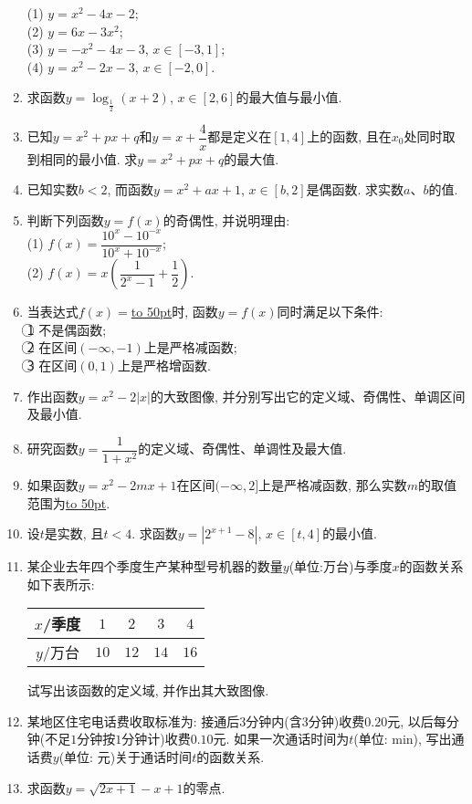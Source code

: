 \documentclass[10pt,a4paper]{article}
\newcommand{\blank}[1]{\underline{\hbox to #1pt{}}}
\begin{document}
\begin{enumerate}[1.]
(1) $y=x^2-4x-2$;\\
(2) $y=6x-3x^2$;\\
(3) $y=-x^2-4x-3$, $x\in [-3, 1]$;\\
(4) $y=x^2-2x-3$, $x\in [-2, 0]$.
\item 求函数$y=\log_{\frac 12}(x+2)$, $x\in [2, 6]$的最大值与最小值.
\item 已知$y=x^2+px+q$和$y=x+\dfrac 4x$都是定义在$[1, 4]$上的函数, 且在$x_0$处同时取到相同的最小值. 求$y=x^2+px+q$的最大值.
\item 已知实数$b<2$, 而函数$y=x^2+ax+1$, $x\in [b, 2]$是偶函数. 求实数$a$、$b$的值.
\item 判断下列函数$y=f(x)$的奇偶性, 并说明理由:\\
(1) $f(x)=\dfrac{10^x-10^{-x}}{10^x+10^{-x}}$;\\
(2) $f(x)=x(\dfrac 1{2^x-1}+\dfrac 12)$.
\item 当表达式$f(x)=$\blank{50}时, 函数$y=f(x)$同时满足以下条件:\\
\textcircled{1} 不是偶函数;\\
\textcircled{2} 在区间$(-\infty, -1)$上是严格减函数;\\
\textcircled{3} 在区间$(0, 1)$上是严格增函数.
\item 作出函数$y=x^2-2|x|$的大致图像, 并分别写出它的定义域、奇偶性、单调区间及最小值.
\item 研究函数$y=\dfrac1{1+x^2}$的定义域、奇偶性、单调性及最大值.
\item 如果函数$y=x^2-2mx+1$在区间$(-\infty, 2]$上是严格减函数, 那么实数$m$的取值范围为\blank{50}.
\item 设$t$是实数, 且$t<4$. 求函数$y=|2^{x+1}-8|$, $x\in [t, 4]$的最小值.
\item 某企业去年四个季度生产某种型号机器的数量$y$(单位:万台)与季度$x$的函数关系如下表所示:
\begin{center}
\begin{tabular}{|c|c|c|c|c|}
\hline
$x$/季度 & $1$ & $2$ & $3$ & $4$ \\ \hline
$y$/万台 & $10$ & $12$ & $14$ & $16$ \\ \hline
\end{tabular}
\end{center}
试写出该函数的定义域, 并作出其大致图像.
\item 某地区住宅电话费收取标准为: 接通后$3$分钟内(含$3$分钟)收费$0.20$元, 以后每分钟(不足$1$分钟按$1$分钟计)收费$0.10$元. 如果一次通话时间为$t$(单位: $\text{min}$), 写出通话费$y$(单位: 元)关于通话时间$t$的函数关系.
\item 求函数$y=\sqrt{2x+1}-x+1$的零点.

\end{enumerate}
\end{document}
